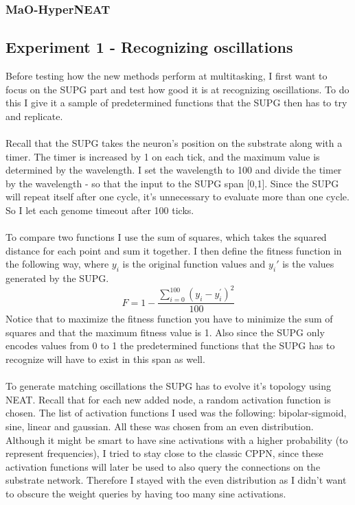 \documentclass[11pt, a4paper]{article}
\begin{document}
\subsubsection{MaO-HyperNEAT}
\subsection{Experiment 1 - Recognizing oscillations}
Before testing how the new methods perform at  multitasking, I first want to focus on the SUPG part and test how good it is at recognizing oscillations. To do this I give it a sample of predetermined functions that the SUPG then has to try and replicate.
\\
\\
Recall that the SUPG takes the neuron's position on the substrate along with a timer. The timer is increased by 1 on each tick, and the maximum value is determined by the wavelength. I set the wavelength to 100 and divide the timer by the wavelength - so that the input to the SUPG span [0,1]. Since the SUPG will repeat itself after one cycle, it's unnecessary to evaluate more than one cycle. So I let each genome timeout after 100 ticks.
\\
\\
To compare two functions I use the sum of squares, which takes the squared distance for each point and sum it together. I then define the fitness function in the following way, where $ y_i $ is the original function values and $ y_i' $ is the values generated by the SUPG.
\begin{equation} F = 1 - \dfrac{\sum_{i=0}^{100}(y_i-y_i^{'})^2}{100} \end{equation}
Notice that to maximize the fitness function you have to minimize the sum of squares and that the maximum fitness value is 1. Also since the SUPG only encodes values from 0 to 1 the predetermined functions that the SUPG has to recognize will have to exist in this span as well.
\\
\\
To generate matching oscillations the SUPG has to evolve it's topology using NEAT. Recall that for each new added node, a random activation function is chosen. The list of activation functions I used was the following: bipolar-sigmoid, sine, linear and gaussian. All these was chosen from an even distribution. Although it might be smart to have sine activations with a higher probability (to represent frequencies), I tried to stay close to the classic CPPN, since these activation functions will later be used to also query the connections on the substrate network. Therefore I stayed with the even distribution as I didn't want to obscure the weight queries by having too many sine activations.
\end{document}

